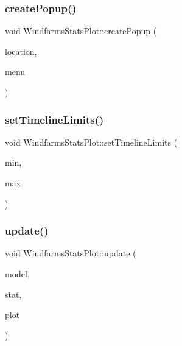 \subsubsection{\texorpdfstring{createPopup()}{createPopup()}}
{\footnotesize\ttfamily void Windfarms\+Stats\+Plot\+::create\+Popup (\begin{DoxyParamCaption}\item[{\mbox{\hyperlink{class_graph_interaction_controller_a67e6eba082927bf2b984bed54fe32764}{Graph\+Interaction\+Controller\+::\+Popup\+Menu\+Location}}}]{location,  }\item[{Q\+Menu $\ast$}]{menu }\end{DoxyParamCaption})}

\mbox{\label{class_windfarms_stats_plot_ac6cbcaa88f3834d6ec3035bdb03c8d49}} 
\subsubsection{\texorpdfstring{setTimelineLimits()}{setTimelineLimits()}}
{\footnotesize\ttfamily void Windfarms\+Stats\+Plot\+::set\+Timeline\+Limits (\begin{DoxyParamCaption}\item[{double}]{min,  }\item[{double}]{max }\end{DoxyParamCaption})\hspace{0.3cm}{\ttfamily [inline]}}

\mbox{\label{class_windfarms_stats_plot_ab5c039952a27d958c13990e47753c602}} 
\subsubsection{\texorpdfstring{update()}{update()}\hspace{0.1cm}{\footnotesize\ttfamily [1/2]}}
{\footnotesize\ttfamily void Windfarms\+Stats\+Plot\+::update (\begin{DoxyParamCaption}\item[{\mbox{\hyperlink{class_displace_model}{Displace\+Model}} $\ast$}]{model,  }\item[{\mbox{\hyperlink{namespacedisplace_1_1plot_a8b9bfd155809bb203b09c572304a62c3}{displace\+::plot\+::\+Windfarms\+Stat}}}]{stat,  }\item[{\mbox{\hyperlink{class_q_custom_plot}{Q\+Custom\+Plot}} $\ast$}]{plot }\end{DoxyParamCaption})}

